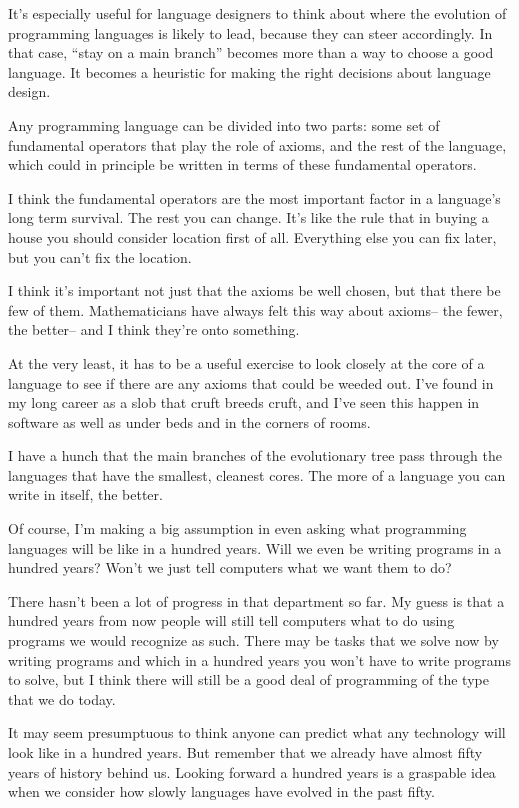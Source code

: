 \documentclass[12pt]{book}
\begin{document}
It's especially useful for language designers to think about where the
evolution of programming languages is likely to lead, because they can
steer accordingly. In that case, ``stay on a main branch'' becomes more
than a way to choose a good language. It becomes a heuristic for making
the right decisions about language design.

Any programming language can be divided into two parts: some set of
fundamental operators that play the role of axioms, and the rest of the
language, which could in principle be written in terms of these
fundamental operators.

I think the fundamental operators are the most important factor in a
language's long term survival. The rest you can change. It's like the
rule that in buying a house you should consider location first of all.
Everything else you can fix later, but you can't fix the location.

I think it's important not just that the axioms be well chosen, but that
there be few of them. Mathematicians have always felt this way about
axioms-- the fewer, the better-- and I think they're onto something.

At the very least, it has to be a useful exercise to look closely at the
core of a language to see if there are any axioms that could be weeded
out. I've found in my long career as a slob that cruft breeds cruft, and
I've seen this happen in software as well as under beds and in the
corners of rooms.

I have a hunch that the main branches of the evolutionary tree pass
through the languages that have the smallest, cleanest cores. The more
of a language you can write in itself, the better.

Of course, I'm making a big assumption in even asking what programming
languages will be like in a hundred years. Will we even be writing
programs in a hundred years? Won't we just tell computers what we want
them to do?

There hasn't been a lot of progress in that department so far. My guess
is that a hundred years from now people will still tell computers what
to do using programs we would recognize as such. There may be tasks that
we solve now by writing programs and which in a hundred years you won't
have to write programs to solve, but I think there will still be a good
deal of programming of the type that we do today.

It may seem presumptuous to think anyone can predict what any technology
will look like in a hundred years. But remember that we already have
almost fifty years of history behind us. Looking forward a hundred years
is a graspable idea when we consider how slowly languages have evolved
in the past fifty.
\end{document}
